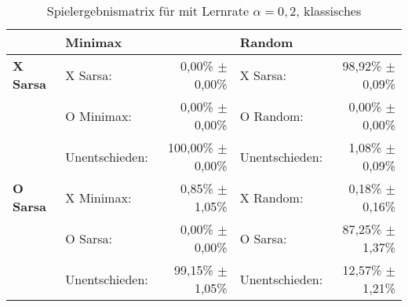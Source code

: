 \begin{table}
\centering
\caption[Spielergebnismatrix \sarsa: $\alpha=0,2$, klassisches \splay]{Spielergebnismatrix für \sarsa mit Lernrate $\alpha=0,2$, klassisches \splay}

\begin{tabular}{llrlr}
\toprule
 & \multicolumn{2}{l}{\textbf{Minimax}} & \multicolumn{2}{l}{\textbf{Random}} \\ \midrule
\textbf{X Sarsa}        & X Sarsa:          & 0,00\% $\pm$    0,00\%            & X Sarsa:              & 98,92\% $\pm$ 0,09\%  \\
                        & O Minimax:        & 0,00\% $\pm$    0,00\%            & O Random:             & 0,00\% $\pm$  0,00\%  \\
                        & Unentschieden:    & 100,00\% $\pm$  0,00\%            & Unentschieden:        & 1,08\% $\pm$  0,09\%  \\ \cmidrule{2-5}
\textbf{O Sarsa}        & X Minimax:        & 0,85\% $\pm$    1,05\%            & X Random:             & 0,18\% $\pm$  0,16\%  \\
                        & O Sarsa:          & 0,00\% $\pm$    0,00\%            & O Sarsa:              & 87,25\% $\pm$ 1,37\%  \\
                        & Unentschieden:    & 99,15\% $\pm$   1,05\%            & Unentschieden:        & 12,57\% $\pm$ 1,21\%  \\ \bottomrule
\end{tabular}
\end{table}
